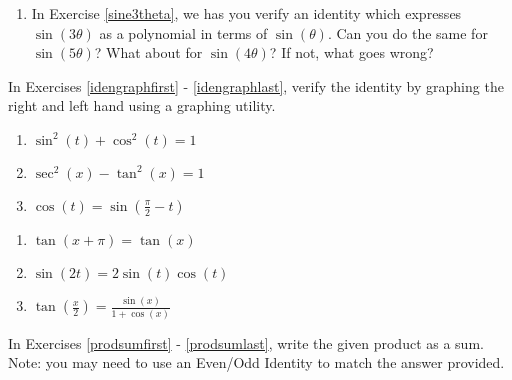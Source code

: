 \begin{enumerate}
\item In Exercise \ref{sine3theta}, we has you verify an identity which expresses $\sin(3\theta)$ as a polynomial in terms of $\sin(\theta)$.   Can you do the same for  $\sin(5\theta)$?  What about for $\sin(4\theta)$?  If not, what goes wrong?

\setcounter{HW}{\value{enumi}}

\end{enumerate}

In Exercises \ref{idengraphfirst} - \ref{idengraphlast}, verify the identity by graphing the right and left hand using a graphing utility.

\begin{multicols}{3}

\begin{enumerate}

\setcounter{enumi}{\value{HW}}

\item $\sin^{2}(t) + \cos^{2}(t) = 1$  \label{idengraphfirst} 
\item $\sec^{2}(x) - \tan^{2}(x) = 1$ 
\item  $\cos(t) = \sin\left(\frac{\pi}{2} - t\right)$

\setcounter{HW}{\value{enumi}}

\end{enumerate}

\end{multicols}

\begin{multicols}{3}

\begin{enumerate}

\setcounter{enumi}{\value{HW}}

\item  $\tan(x+\pi) = \tan(x)$ 
\item  $\sin(2t) = 2\sin(t)\cos(t)$ 
\item  $\tan\left(\frac{x}{2}\right) = \frac{\sin(x)}{1+\cos(x)}$ \label{idengraphlast}

\setcounter{HW}{\value{enumi}}

\end{enumerate}

\end{multicols}


In Exercises \ref{prodsumfirst} - \ref{prodsumlast}, write the  given product as a sum. Note: you may need to use an Even/Odd Identity to match the answer provided.

